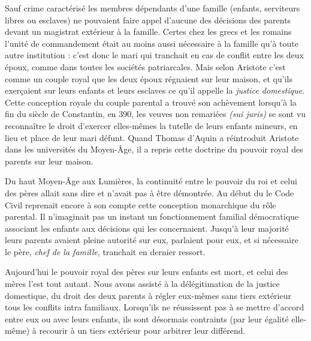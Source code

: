  Sauf crime caractérisé les membres dépendants d'une famille (enfants, serviteurs libres ou esclaves) ne pouvaient faire appel d'aucune des décisions des parents devant un magistrat extérieur à la famille. Certes chez les grecs et les romains l'unité de commandement était au moins aussi nécessaire à la famille qu'à toute autre institution : c'est donc le mari qui tranchait en cas de conflit entre les deux époux, comme dans toutes les sociétés patriarcales. Mais selon Aristote c'est comme un couple royal que les deux époux régnaient sur leur maison, et qu'ils exerçaient sur leurs enfants et leurs esclaves ce qu'il appelle la \emph{justice domestique}. Cette conception royale du couple parental a trouvé son achèvement lorsqu'à la fin du siècle de Constantin, en 390, les veuves non remariées \emph{(sui juris)} se sont vu reconnaître le droit d'exercer elles-mêmes la tutelle de leurs enfants mineurs, en lieu et place de leur mari défunt. Quand Thomas d'Aquin a réintroduit Aristote dans les universités du Moyen-Âge, il a repris cette doctrine du pouvoir royal des parents sur leur maison. 

 Du haut Moyen-Âge aux Lumières, la continuité entre le pouvoir du roi et celui des pères allait sans dire et n'avait pas à être démontrée. Au début du  le Code Civil reprenait encore à son compte cette conception monarchique du rôle parental. Il n'imaginait pas un instant un fonctionnement familial démocratique associant les enfants aux décisions qui les concernaient. Jusqu'à leur majorité leurs parents avaient pleine autorité sur eux, parlaient pour eux, et si nécessaire le père, \emph{chef de la famille}, tranchait en dernier ressort.

 Aujourd'hui le pouvoir royal des pères sur leurs enfants est mort, et celui des mères l'est tout autant. Nous avons assisté à la délégitimation de la justice domestique, du droit des deux parents à régler eux-mêmes sans tiers extérieur tous les conflits intra familiaux. Lorsqu'ils ne réussissent pas à se mettre d'accord entre eux ou avec leurs enfants, ils sont désormais contraints (par leur égalité elle-même) à recourir à un tiers extérieur pour arbitrer leur différend. 

